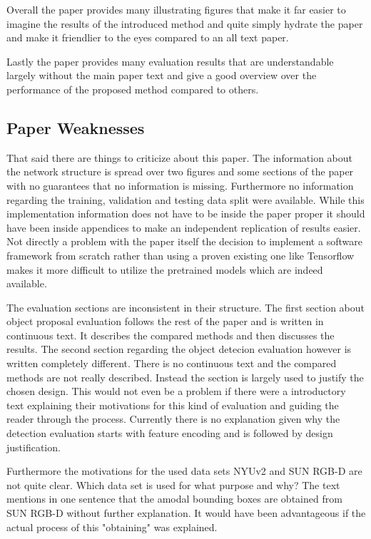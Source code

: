 \documentclass[12pt]{scrartcl}
\begin{document}
Overall the paper provides many illustrating figures that make it far easier
to imagine the results of the introduced method and quite simply hydrate the
paper and make it friendlier to the eyes compared to an all text paper.

Lastly the paper provides many evaluation results that are understandable
largely without the main paper text and give a good overview over the performance
of the proposed method compared to others.


\subsection{Paper Weaknesses} %
\label{sub:paper_weaknesses}

That said there are things to criticize about this paper. The information about
the network structure is spread over two figures and some sections of the paper
with no guarantees that no information is missing. Furthermore no information
regarding the training, validation and testing data split were available. While
this implementation information does not have to be inside the paper proper it
should have been inside appendices to make an independent replication of results
easier. Not directly a problem with the paper itself the decision to implement
a software framework from scratch rather than using a proven existing one like
Tensorflow makes it more difficult to utilize the pretrained models which are
indeed available.

The evaluation sections are inconsistent in their structure. The first section
about object proposal evaluation follows the rest of the paper and is written
in continuous text. It describes the compared methods and then discusses the
results. The second section regarding the object detecion evaluation however
is written completely different. There is no continuous text and the compared
methods are not really described. Instead the section is largely used to justify
the chosen design. This would not even be a problem if there were a introductory
text explaining their motivations for this kind of evaluation and guiding the
reader through the process. Currently there is no explanation given why
the detection evaluation starts with feature encoding and is followed by
design justification.

Furthermore the motivations for the used data sets NYUv2 and SUN RGB-D are
not quite clear. Which data set is used for what purpose and why? The text
mentions in one sentence that the amodal bounding boxes are obtained from
SUN RGB-D without further explanation. It would have been advantageous
if the actual process of this "obtaining" was explained.
\end{document}
